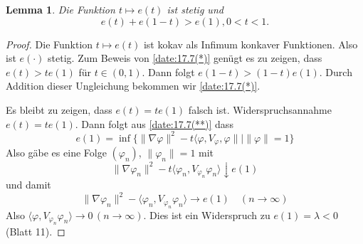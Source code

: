 \documentclass[
paper=a4,
bibtotocnumbered,
liststotocnumbered,
tablecaptionabove,
pointlessnumbers,
twoside,
openright,
10pt
]
{report}
\let\phi\varphi
\newtheorem{lem}[thm]{Lemma}
\theoremstyle{definition}
\numberwithin{equation}{chapter}
\begin{document}
\begin{lem}\label{5.11}
Die Funktion $t\mapsto e(t)$ ist stetig und
\begin{equation}\label{date:17.7(*)}
e(t) + e(1-t) > e(1), 0 < t < 1.
\end{equation}
\end{lem}
\begin{proof}
Die Funktion $t\mapsto e(t)$ ist kokav als Infimum konkaver Funktionen. Also ist $e(\cdot)$ stetig. Zum Beweis von  \eqref{date:17.7(*)} genügt es zu zeigen, dass $e(t) > t e(1)$ für $t\in (0,1)$. Dann folgt $e(1-t) > (1-t) e(1)$. Durch Addition dieser Ungleichung bekommen wir \eqref{date:17.7(*)}. 

Es bleibt zu zeigen, dass $e(t)= t e(1)$ falsch ist. Widerspruchsannahme $e(t) = t e(1)$. Dann folgt aus \eqref{date:17.7(**)} dass
\begin{equation}
e(1) = \inf\{ \| \nabla \phi\|^2- t\langle \phi, V_\phi, \phi\|| \| \phi\| =1\}
\end{equation}
Also gäbe es eine Folge $(\phi_n)$, $\| \phi_n\|=1$ mit 
\begin{equation}
\| \nabla \phi_n\|^2 - t\langle \phi_n, V_{\phi_n} \phi_n\rangle \downarrow e(1)
\end{equation}
und damit 
$$\| \nabla \phi_n\|^2 - \langle \phi_n, V_{\phi_n} \phi_n\rangle\to e(1) \quad (n\to \infty)$$
Also $\langle \phi, V_{\phi_n} \phi_n\rangle\to 0\,(n\to \infty)$. Dies ist ein Widerspruch zu $e(1) = \lambda <0$ (Blatt 11).
\end{proof}
\end{document}
